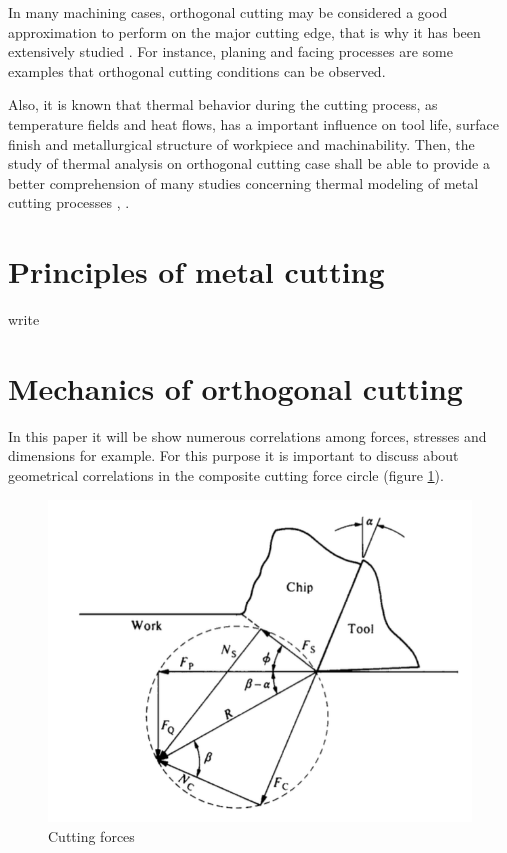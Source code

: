 	In many machining cases, orthogonal cutting may be considered a good approximation to perform on the major cutting edge, that is why it has been extensively studied \cite{shaw2005metal}. For instance, planing and facing processes are some examples that orthogonal cutting conditions can be observed.

	Also, it is known that thermal behavior during the cutting process, as temperature fields and heat flows, has a important influence on tool life, surface finish and metallurgical structure of workpiece and machinability. Then, the study of thermal analysis on orthogonal cutting case shall be able to provide a better comprehension of many studies concerning thermal modeling of metal cutting processes \cite{komanduri2000thermal}, \cite{komanduri2001thermal}.
	
	\section{Principles of metal cutting}
	write

	\section{Mechanics of orthogonal cutting}

	In this paper it will be show numerous correlations among forces, stresses and dimensions for example. For this purpose it is important to discuss about geometrical correlations in the composite cutting force circle (figure \ref{fig:circlec}).

	\begin{figure}[h]
		\centering
		\captionsetup{justification=centering}
		\includegraphics[scale=0.5]{Cap1/circlec.png}
		\caption{Cutting forces \cite{shaw2005metal}}
		\label{fig:circlec}
	\end{figure}


